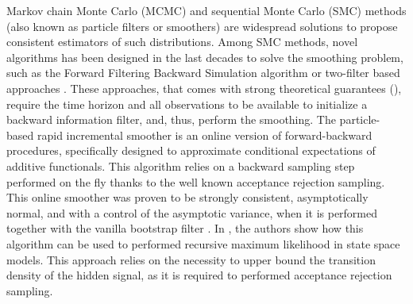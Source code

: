 \documentclass{article}
\begin{document}



Markov chain Monte Carlo (MCMC) and sequential Monte Carlo (SMC) methods (also known as particle filters or smoothers) are widespread solutions to propose consistent estimators of such distributions. 
Among SMC methods, novel algorithms has been designed in the last decades to solve the smoothing problem, such as the Forward Filtering Backward Simulation algorithm \cite{douc2011sequential}  or two-filter based approaches \cite{briers2010smoothing, fearnhead2010sequential, nguyen2017two}. %
These approaches, that comes with strong theoretical guarantees (\cite{delmoral2010backward, douc2011sequential, dubarry2013nonasymptotic, gerber2017convergence}), require the time horizon and all observations to be available  to initialize a backward information filter, and, thus, perform the smoothing.
The particle-based rapid incremental smoother \cite{olsson2017efficient} is an online version of forward-backward procedures, specifically designed to approximate conditional expectations of additive functionals. 
This algorithm relies on a backward sampling step performed on the fly thanks to the well known acceptance rejection sampling. 
This online smoother was proven to be strongly consistent, asymptotically normal, and with a control of the asymptotic variance, when it is performed together with the vanilla bootstrap filter \cite{gordon1993novel}. 
In \cite{olsson2020particle}, the authors show how this algorithm can be used to performed recursive maximum likelihood in state space models. This approach relies on the necessity to upper bound the transition density of the hidden signal, as it is required to performed acceptance rejection sampling.
\end{document}
